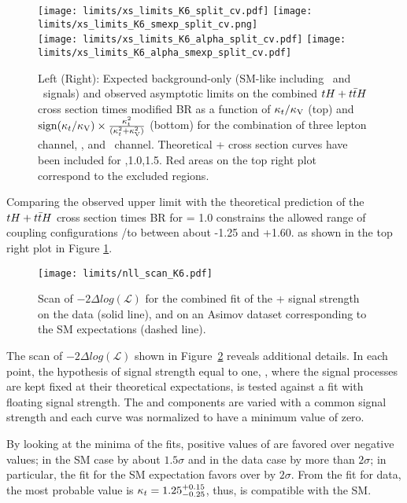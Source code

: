\begin{figure} [!h]
 \centering
 \texttt{[image: limits/xs\_limits\_K6\_split\_cv.pdf]}
 \texttt{[image: limits/xs\_limits\_K6\_smexp\_split\_cv.png]}\\ 
 \texttt{[image: limits/xs\_limits\_K6\_alpha\_split\_cv.pdf]}
 \texttt{[image: limits/xs\_limits\_K6\_alpha\_smexp\_split\_cv.pdf]}    
\caption[Asymptotic limits on the combined $\tH+\ttH$ $\sigma\times$BR, ,1.0,1.5 .]{Left (Right): Expected background-only (SM-like including  \ttH\ and \tH\ signals) and observed asymptotic limits on the combined $\tH+\ttH$ cross section times modified BR as a function of $\kappa_t/\kappa_\text{V}$ (top) and $\mathrm{sign}(\kappa_t/\kappa_\text{V})\times\frac{\kappa_t^2}{(\kappa_t^2+\kappa_\text{V}^2)}$ (bottom) for the combination of three lepton channel, \mumu, and \emu\ channel. Theoretical \tH + \ttH cross section curves have been included for ,1.0,1.5. Red areas on the top right plot correspond to the excluded regions. }
\label{fig:xs_limits_cv}
\end{figure}

Comparing the observed upper limit with the theoretical prediction of the ${tH + t\bar{t}H}$ cross section times BR for \CV = 1.0 constrains the allowed range of coupling configurations \Ct/\CV to between about -1.25 and +1.60. as shown in the top right plot in Figure \ref{fig:xs_limits_cv}.

\begin{figure} [!h]
 \centering
 \texttt{[image: limits/nll\_scan\_K6.pdf]}    
 \caption[Scan of $-2\Delta log (\mathcal{L})$ for the combined fit of the \tH + \ttH signal strength.]{Scan of $-2\Delta log (\mathcal{L})$ for the combined fit of the \tH + \ttH signal strength on the data (solid line), and on an Asimov dataset corresponding to the SM expectations (dashed line).}
\label{fig:nll_scan}
\end{figure}

The scan of $-2\Delta log (\mathcal{L})$ shown in Figure~\ref{fig:nll_scan} reveals additional details. In each point, the hypothesis of signal strength equal to one, \ie, where the signal processes are kept fixed at their theoretical expectations, is tested against a fit with floating signal strength. The \tH and \ttH components are varied with a common signal strength and each curve was normalized to have a minimum value of zero.

By looking at the minima of the fits, positive values of \Ct are favored over negative values; in the SM case by about $1.5\sigma$ and in the data case by more than $2\sigma$; in particular, the fit for the SM expectation favors  over  by $2\sigma$. From the fit for data, the most probable value is $\kappa_t=1.25^{+0.15}_{-0.25}$, thus, \Ct is compatible with the SM.

